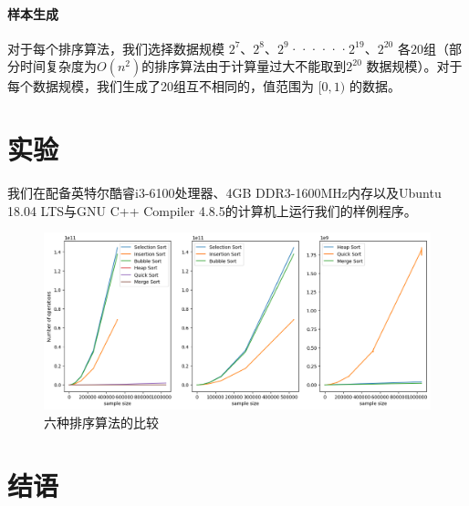 \documentclass[UTF8]{ctexart}
\begin{document}
\paragraph{样本生成}
对于每个排序算法，我们选择数据规模 $2^7$、$2^8$、$2^9$······$2^{19}$、$2^{20}$ 各20组（部分时间复杂度为$O(n^2)$的排序算法由于计算量过大不能取到$2^{20}$ 数据规模）。对于每个数据规模，我们生成了20组互不相同的，值范围为  $[0, 1)$ 的数据。

\section{实验}
我们在配备英特尔\textregistered 酷睿\texttrademark i3-6100处理器、4GB DDR3-1600MHz内存以及Ubuntu 18.04 LTS与GNU C++ Compiler 4.8.5的计算机上运行我们的样例程序。

\begin{figure}[h]
\includegraphics[width=\textwidth]{fig1.png}
\caption{六种排序算法的比较}
\end{figure}

\section{结语}

\renewcommand{\refname}{参考文献}

\end{document}
